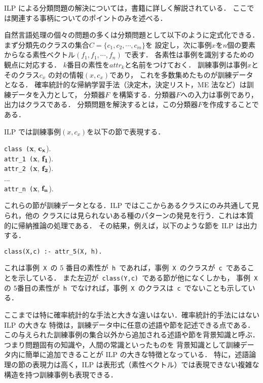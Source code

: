 ILP による分類問題の解決については，書籍\cite{furukawa}に詳しく解説されている．
ここでは関連する事柄についてのポイントのみを述べる．

自然言語処理の個々の問題の多くは分類問題として以下のように定式化できる．
まず分類先のクラスの集合\( C = \{ c_1,c_2, \cdots, c_m \} \)を
設定し，次に事例\( x \)を\( n \)個の要素からなる素性ベクトル\( ( f_1, f_1, \cdots, f_n ) \) で表す．
各素性は事例を識別するための観点に対応する．
\( k \)番目の素性を\( attr_k \)と名前をつけておく．
訓練事例は事例\( x \)とそのクラス\( c_x \) の対の情報\( (x, c_x) \)であり，
これを多数集めたものが訓練データとなる．
確率統計的な帰納学習手法（決定木，決定リスト，ME 法など）は訓練データを入力として，
分類器\( F \) を構築する．分類器\( F \)への入力は事例であり，出力はクラスである．
分類問題を解決するとは，この分類器\( F \)を作成することである．

ILP では訓練事例\( (x, c_x) \)を以下の節で表現する．

\bigskip

\hspace{25mm}
\begin{minipage}[t]{50mm}
\verb|class (|{\bf x}, \(\bf{c_x}\)).\\
\verb|attr_1 (|{\bf x}, \(\bf{f_1}\)).\\
\verb|attr_2 (|{\bf x}, \(\bf{f_2}\)).\\
 ...\\
\verb|attr_n (|{\bf x}, \(\bf{f_n}\)).
\end{minipage}

\bigskip

これらの節が訓練データとなる．ILP ではここからあるクラスにのみ共通して見られ，他の
クラスには見られないある種のパターンの発見を行う．これは本質的に帰納推論の処理である．
その結果，例えば，以下のような節を ILP は出力する．

\bigskip

\hspace{25mm}
\begin{minipage}[t]{50mm}
\verb|class(X,c) :- attr_5(X, h).|
\end{minipage}

\bigskip

これは事例\verb| X |の 5 番目の素性が\verb| h |であれば，事例\verb| X |のクラスが\verb| c |であることを示している．
また左辺が\verb| class(Y,c) |である節が他になくしかも，
事例\verb| X |の 5番目の素性が\verb| h |でなければ，事例\verb| X |のクラスは\verb| c |でないことも示している．

ここまでは特に確率統計的な手法と大きな違いはない．確率統計的手法にはない ILP の大きな
特徴は，訓練データ中に任意の述語や節を記述できる点である．
この与えられた訓練事例の集合以外から追加される述語や節を背景知識と呼ぶ．
つまり問題固有の知識や，人間の常識といったものを
背景知識として訓練データ内に簡単に追加できることが ILP の大きな特徴となっている．
特に，述語論理の節の表現力は高く，ILP は表形式（素性ベクトル）では表現できない複雑な構造を持つ訓練事例も表現できる．

